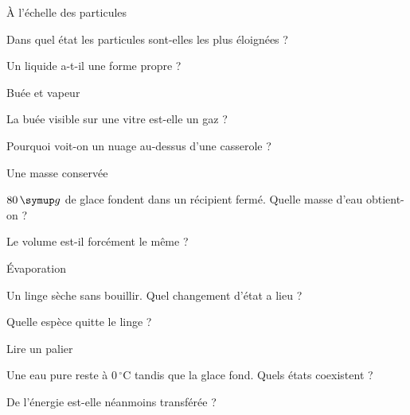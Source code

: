 \par\noindent\begin{minipage}{\linewidth}
\begin{exercice}[1]{À l’échelle des particules}
\begin{questions}
\item Dans quel état les particules sont-elles les plus éloignées ?
\item Un liquide a-t-il une forme propre ?
\end{questions}
\end{exercice}
\end{minipage}
\par\noindent\begin{minipage}{\linewidth}
\begin{exercice}[1]{Buée et vapeur}
\begin{questions}
\item La buée visible sur une vitre est-elle un gaz ?
\item Pourquoi voit-on un nuage au-dessus d’une casserole ?
\end{questions}
\end{exercice}
\end{minipage}
\par\noindent\begin{minipage}{\linewidth}
\begin{exercice}[1]{Une masse conservée}
\begin{questions}
\item $80\unite g$ de glace fondent dans un récipient fermé. Quelle masse d’eau obtient-on ?
\item Le volume est-il forcément le même ?
\end{questions}
\end{exercice}
\end{minipage}
\par\noindent\begin{minipage}{\linewidth}
\begin{exercice}[1]{Évaporation}
\begin{questions}
\item Un linge sèche sans bouillir. Quel changement d’état a lieu ?
\item Quelle espèce quitte le linge ?
\end{questions}
\end{exercice}
\end{minipage}
\clearpage{}
\par\noindent\begin{minipage}{\linewidth}
\begin{exercice}[2]{Lire un palier}
\begin{questions}
\item Une eau pure reste à $0\,^{\circ}\mathrm C$ tandis que la glace fond. Quels états coexistent ?
\item De l’énergie est-elle néanmoins transférée ?
\end{questions}
\end{exercice}
\end{minipage}
